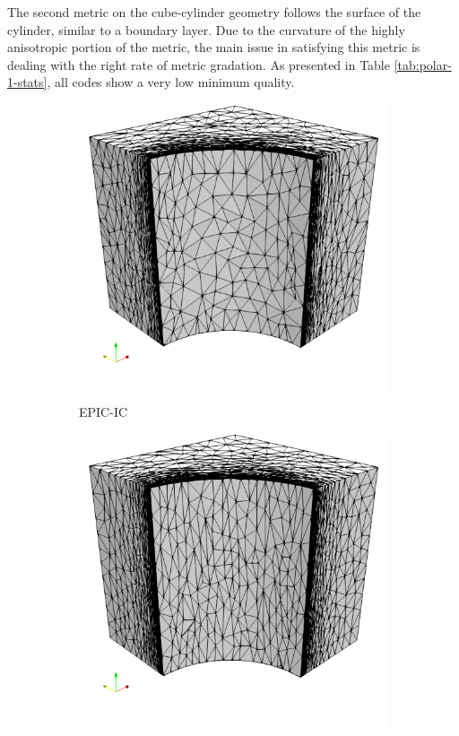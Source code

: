 \documentclass[3p,times,procedia,number]{elsarticle}
\begin{document}
The second metric on the cube-cylinder geometry follows the surface
of the cylinder, similar to a boundary layer.
Due to the curvature of the highly anisotropic portion of the metric,
the main issue in satisfying this metric is dealing with the
right rate of metric gradation.
As presented in Table \ref{tab:polar-1-stats}, all codes show
a very low minimum quality.

\begin{figure}
\begin{subfigure}{.24\textwidth}
\centering
\includegraphics[width=\textwidth]{epic-ic-cube-cylinder-polar-1.png}
\caption{EPIC-IC}
\end{subfigure}
\begin{subfigure}{.24\textwidth}
\centering
\includegraphics[width=\textwidth]{epic-ics-cube-cylinder-polar-1.png}

\end{subfigure}
\end{figure}
\end{document}
